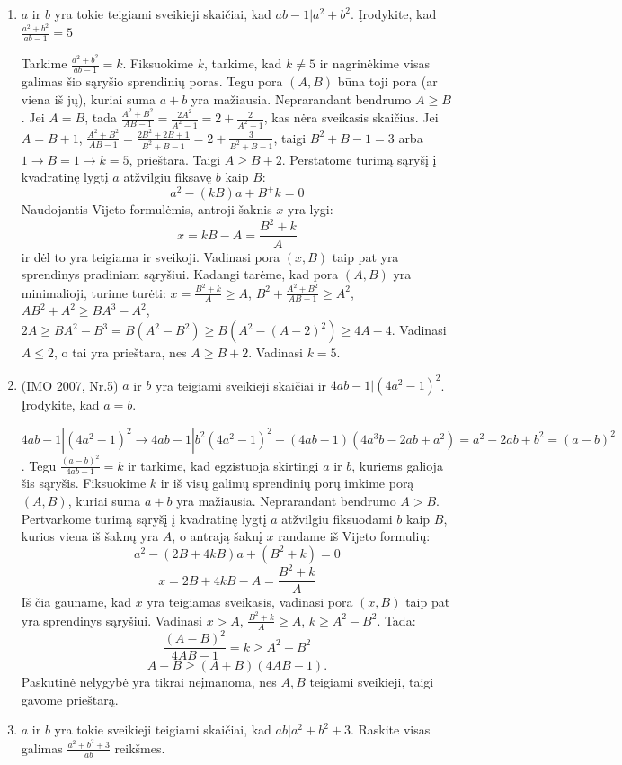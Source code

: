 \begin{enumerate}
\item $a$ ir $b$ yra tokie teigiami sveikieji skaičiai, kad $ab-1|a^2+b^2$. Įrodykite, kad $\frac{a^2+b^2}{ab-1}=5$

\begin{sprendimas}
Tarkime $\frac{a^2+b^2}{ab-1}=k$. Fiksuokime $k$, tarkime, kad $k\not =5$ ir nagrinėkime visas galimas šio sąryšio sprendinių poras. Tegu pora $(A,B)$ būna toji pora (ar viena iš jų), kuriai suma $a+b$ yra mažiausia. Neprarandant bendrumo $A\geq B$. Jei $A=B$, tada $\frac{A^2+B^2}{AB-1}=\frac{2A^2}{A^2-1}=2+\frac{2}{A^2-1}$, kas nėra sveikasis skaičius. Jei $A=B+1$, $\frac{A^2+B^2}{AB-1}=\frac{2B^2+2B+1}{B^2+B-1}=2+\frac{3}{B^2+B-1}$, taigi $B^2+B-1=3$ arba $1\rightarrow B=1 \rightarrow k=5$, prieštara. Taigi $A\geq B+2$. Perstatome turimą sąryšį į kvadratinę lygtį $a$ atžvilgiu fiksavę $b$ kaip $B$:$$a^2-(kB)a+B^+k=0$$ Naudojantis Vijeto formulėmis, antroji šaknis $x$ yra lygi:$$x=kB-A=\frac{B^2+k}{A}$$ ir dėl to yra teigiama ir sveikoji. Vadinasi pora $(x,B)$ taip pat yra sprendinys pradiniam sąryšiui. Kadangi tarėme, kad pora $(A,B)$ yra minimalioji, turime turėti: $x=\frac{B^2+k}{A}\geq A$, $B^2+\frac{A^2+B^2}{AB-1}\geq A^2$, $AB^2+A^2\geq BA^3-A^2$, $2A\geq BA^2-B^3=B(A^2-B^2)\geq B(A^2-(A-2)^2)\geq 4A-4$. Vadinasi $A \leq2$, o tai yra prieštara, nes $A\geq B+2$. Vadinasi $k=5$.
\end{sprendimas}

\item (IMO 2007, Nr.5) $a$ ir $b$ yra teigiami sveikieji skaičiai ir 
\mbox{$4ab-1|(4a^2-1)^2$}. Įrodykite, kad $a=b$.

\begin{sprendimas}
$4ab-1|(4a^2-1)^2 \rightarrow 4ab-1|b^2(4a^2-1)^2-(4ab-1)(4a^3b-2ab+a^2)=a^2-2ab+b^2=(a-b)^2$. Tegu $\frac{(a-b)^2}{4ab-1}=k$ ir tarkime, kad egzistuoja skirtingi $a$ ir $b$, kuriems galioja šis sąryšis. Fiksuokime $k$ ir iš visų galimų sprendinių porų imkime porą $(A,B)$, kuriai suma $a+b$ yra mažiausia. Neprarandant bendrumo $A>B$. Pertvarkome turimą sąryšį į kvadratinę lygtį $a$ atžvilgiu fiksuodami $b$ kaip $B$, kurios viena iš šaknų yra $A$, o antrają šaknį $x$ randame iš Vijeto formulių:$$a^2-(2B+4kB)a+(B^2+k)=0$$ $$x=2B+4kB-A=\frac{B^2+k}{A}$$ Iš čia gauname, kad $x$ yra teigiamas sveikasis, vadinasi pora $(x,B)$ taip pat yra sprendinys sąryšiui. Vadinasi $x>A$, $\frac{B^2+k}{A} \geq A$, $k\geq A^2-B^2$. Tada: $$\frac{(A-B)^2}{4AB-1}=k\geq A^2-B^2$$
$$A-B\geq (A+B)(4AB-1).$$ Paskutinė nelygybė yra tikrai neįmanoma, nes $A,B$ teigiami sveikieji, taigi gavome prieštarą.
\end{sprendimas}
\item $a$ ir $b$ yra tokie sveikieji teigiami skaičiai, kad $ab|a^2+b^2+3$. Raskite visas galimas $\frac{a^2+b^2+3}{ab}$ reikšmes.


\end{enumerate}
